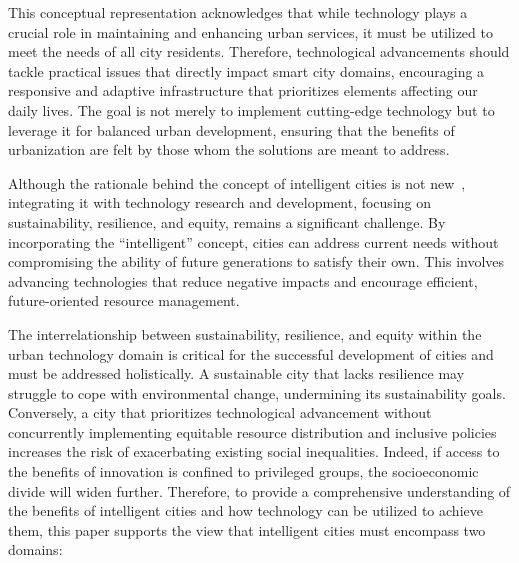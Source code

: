 \documentclass[smartcities,article,submit,pdftex,moreauthors]{Definitions/mdpi}
\begin{document}
This conceptual representation acknowledges that while technology plays a crucial role in maintaining and enhancing urban services, it must be utilized to meet the needs of all city residents. Therefore, technological advancements should tackle practical issues that directly impact smart city domains, encouraging a responsive and adaptive infrastructure that prioritizes elements affecting our daily lives. The goal is not merely to implement cutting-edge technology but to leverage it for balanced urban development, ensuring that the benefits of urbanization are felt by those whom the solutions are meant to address.

Although the rationale behind the concept of intelligent cities is not new~\cite{SCInclusiveFuture,SCHappiness,repetteCityAsPlatformDevelopment2021,ParticipatoryGovernanceNYC,bibriSustainableCitiesTechnologies2023}, integrating it with technology research and development, focusing on sustainability, resilience, and equity, remains a significant challenge. By incorporating the ``intelligent'' concept, cities can address current needs without compromising the ability of future generations to satisfy their own. This involves advancing technologies that reduce negative impacts and encourage efficient, future-oriented resource management.

The interrelationship between sustainability, resilience, and equity within the urban technology domain is critical for the successful development of cities and must be addressed holistically. A sustainable city that lacks resilience may struggle to cope with environmental change, undermining its sustainability goals. Conversely, a city that prioritizes technological advancement without concurrently implementing equitable resource distribution and inclusive policies increases the risk of exacerbating existing social inequalities. Indeed, if access to the benefits of innovation is confined to privileged groups, the socioeconomic divide will widen further. Therefore, to provide a comprehensive understanding of the benefits of intelligent cities and how technology can be utilized to achieve them, this paper supports the view that intelligent cities must encompass two domains:
\end{document}
